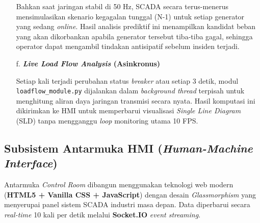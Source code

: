 \begin{enumerate}
Bahkan saat jaringan stabil di 50 Hz, SCADA secara terus-menerus mensimulasikan skenario kegagalan tunggal (N-1) untuk setiap generator yang sedang \textit{online}.
Hasil analisis prediktif ini menampilkan kandidat beban yang akan dikorbankan apabila generator tersebut tiba-tiba gagal, sehingga operator dapat mengambil tindakan antisipatif sebelum insiden terjadi.

\item[f.] \textbf{\textit{Live Load Flow Analysis} (Asinkronus)}

Setiap kali terjadi perubahan status \textit{breaker} atau setiap 3 detik, modul \texttt{loadflow\_module.py} dijalankan dalam \textit{background thread} terpisah untuk menghitung aliran daya jaringan transmisi secara nyata.
Hasil komputasi ini dikirimkan ke HMI untuk memperbarui visualisasi \textit{Single Line Diagram} (SLD) tanpa mengganggu \textit{loop} monitoring utama 10 FPS.
\end{enumerate}

\subsection{Subsistem Antarmuka HMI (\textit{Human-Machine Interface})}
\label{subsec:HMI}

Antarmuka \textit{Control Room} dibangun menggunakan teknologi web modern (\textbf{HTML5 + Vanilla CSS + JavaScript}) dengan desain \textit{Glassmorphism} yang menyerupai panel sistem SCADA industri masa depan.
Data diperbarui secara \textit{real-time} 10 kali per detik melalui \textbf{Socket.IO} \textit{event streaming}.

